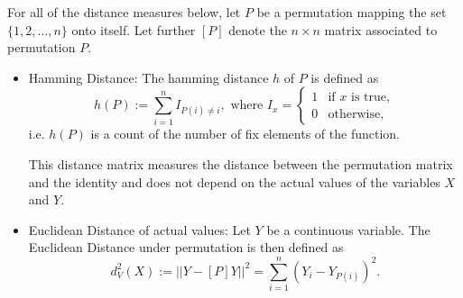 For all of the distance measures below, let $P$ be a permutation mapping  the set $\{1, 2, ..., n\}$ onto itself. Let further $[P]$ denote the $n \times n$ matrix associated to permutation $P$.

\begin{itemize}

\item Hamming Distance: The hamming distance $h$ of $P$ is defined as 
\[
h(P) := \sum_{i=1}^n I_{P(i) \neq i},  \text{ where } I_{x} = \left \{ 
\begin{array}{ll}
1 & \text{if } x \text{ is true},\\
0 & \text{otherwise},
\end{array} \right.
\]
i.e. $h(P)$ is a count of the number of fix elements of the function.




This distance matrix measures the distance between the permutation matrix and the identity and does not depend on the actual values of the variables $X$ and $Y$. 




\item Euclidean Distance of actual values: 
Let $Y$ be a continuous variable. The Euclidean Distance under permutation is then defined as 
\[
d^2_V(X) := || Y - [P]Y||^2 = \sum_{i=1}^n (Y_i - Y_{P(i)})^2.
\]







\end{itemize}
